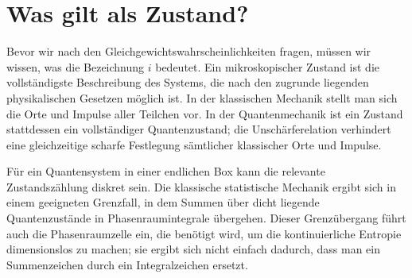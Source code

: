 \begin{classroomqa}
\end{classroomqa}

\section{Was gilt als Zustand?}

Bevor wir nach den Gleichgewichtswahrscheinlichkeiten fragen, müssen wir wissen, was die Bezeichnung \(i\) bedeutet. Ein mikroskopischer Zustand ist die vollständigste Beschreibung des Systems, die nach den zugrunde liegenden physikalischen Gesetzen möglich ist. In der klassischen Mechanik stellt man sich die Orte und Impulse aller Teilchen vor. In der Quantenmechanik ist ein Zustand stattdessen ein vollständiger Quantenzustand; die Unschärferelation verhindert eine gleichzeitige scharfe Festlegung sämtlicher klassischer Orte und Impulse.

Für ein Quantensystem in einer endlichen Box kann die relevante Zustandszählung diskret sein. Die klassische statistische Mechanik ergibt sich in einem geeigneten Grenzfall, in dem Summen über dicht liegende Quantenzustände in Phasenraumintegrale übergehen. Dieser Grenzübergang führt auch die Phasenraumzelle ein, die benötigt wird, um die kontinuierliche Entropie dimensionslos zu machen; sie ergibt sich nicht einfach dadurch, dass man ein Summenzeichen durch ein Integralzeichen ersetzt.

\begin{classroomqa}
\end{classroomqa}

